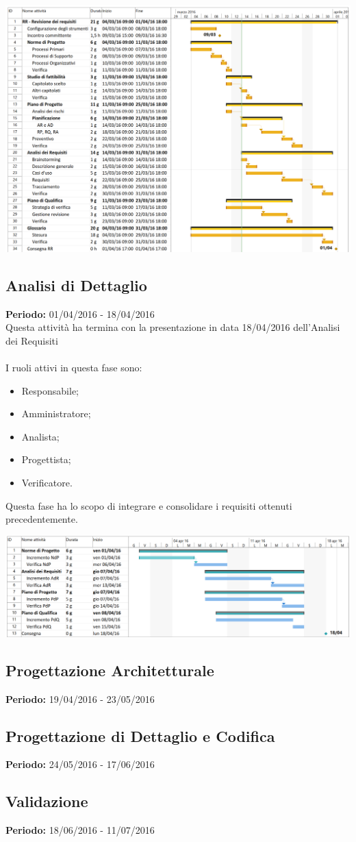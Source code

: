 \includegraphics[width= 16cm]{AR.png}

\subsection{Analisi di Dettaglio}
\textbf{Periodo:} 01/04/2016 - 18/04/2016\\
Questa attività ha termina con la presentazione in data 18/04/2016 dell'Analisi 
dei Requisiti\\\\
I ruoli attivi in questa fase sono:

\begin{itemize}
	\item Responsabile;
	\item Amministratore;
	\item Analista;
	\item Progettista;
	\item Verificatore.
\end{itemize}
Questa fase ha lo scopo di integrare e consolidare i requisiti ottenuti 
precedentemente.

\includegraphics[width= 16cm]{AD.png}

\subsection{Progettazione Architetturale}
\textbf{Periodo:} 19/04/2016 - 23/05/2016\\

\subsection{Progettazione di Dettaglio e Codifica}
\textbf{Periodo:} 24/05/2016 - 17/06/2016\\

\subsection{Validazione}
\textbf{Periodo:} 18/06/2016 - 11/07/2016\\